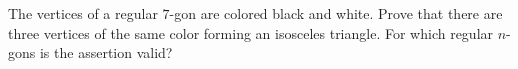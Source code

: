 The vertices of a regular $7$-gon are colored black and white. Prove that there are three vertices of the same color forming an isosceles triangle. For which regular $n$-gons is the assertion valid?
